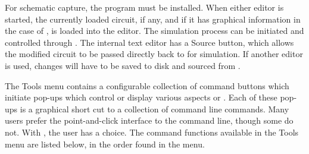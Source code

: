 For schematic capture, the {\Xic} program must be installed.  When
either editor is started, the currently loaded circuit, if any, and if
it has graphical information in the case of {\Xic}, is loaded into the
editor.  The simulation process can be initiated and controlled
through {\Xic}.  The internal text editor has a {\cb Source} button,
which allows the modified circuit to be passed directly back to
{\WRspice} for simulation.  If another editor is used, changes will
have to be saved to disk and sourced from {\WRspice}.

The {\cb Tools} menu contains a configurable collection of command
buttons which initiate pop-ups which control or display various
aspects or {\WRspice}.  Each of these pop-ups is a graphical short cut
to a collection of command line commands.  Many users prefer the
point-and-click interface to the command line, though some do not. 
With {\WRspice}, the user has a choice.  The command functions
available in the {\cb Tools} menu are listed below, in the order found
in the menu.

